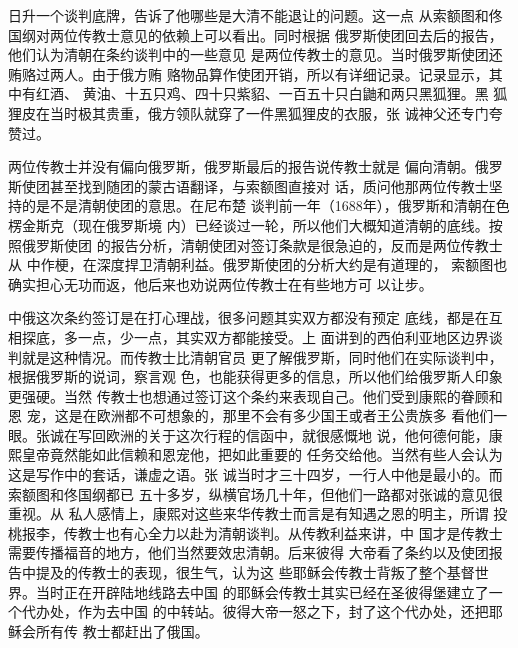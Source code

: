 日升一个谈判底牌，告诉了他哪些是大清不能退让的问题。这一点%
从索额图和佟国纲对两位传教士意见的依赖上可以看出。同时根据%
俄罗斯使团回去后的报告，他们认为清朝在条约谈判中的一些意见%
是两位传教士的意见。当时俄罗斯使团还贿赂过两人。由于俄方贿%
赂物品算作使团开销，所以有详细记录。记录显示，其中有红酒、%
黄油、十五只鸡、四十只紫貂、一百五十只白鼬和两只黑狐狸。黑%
狐狸皮在当时极其贵重，俄方领队就穿了一件黑狐狸皮的衣服，张%
诚神父还专门夸赞过。%
\par
两位传教士并没有偏向俄罗斯，俄罗斯最后的报告说传教士就是%
偏向清朝。俄罗斯使团甚至找到随团的蒙古语翻译，与索额图直接对%
话，质问他那两位传教士坚持的是不是清朝使团的意思。在尼布楚%
谈判前一年（1688年），俄罗斯和清朝在色楞金斯克（现在俄罗斯境%
内）已经谈过一轮，所以他们大概知道清朝的底线。按照俄罗斯使团%
的报告分析，清朝使团对签订条款是很急迫的，反而是两位传教士从%
中作梗，在深度捍卫清朝利益。俄罗斯使团的分析大约是有道理的，%
索额图也确实担心无功而返，他后来也劝说两位传教士在有些地方可%
以让步。%
\par
中俄这次条约签订是在打心理战，很多问题其实双方都没有预定%
底线，都是在互相探底，多一点，少一点，其实双方都能接受。上%
面讲到的西伯利亚地区边界谈判就是这种情况。而传教士比清朝官员%
更了解俄罗斯，同时他们在实际谈判中，根据俄罗斯的说词，察言观%
色，也能获得更多的信息，所以他们给俄罗斯人印象更强硬。当然%
传教士也想通过签订这个条约来表现自己。他们受到康熙的眷顾和恩%
宠，这是在欧洲都不可想象的，那里不会有多少国王或者王公贵族多%
看他们一眼。张诚在写回欧洲的关于这次行程的信函中，就很感慨地%
说，他何德何能，康熙皇帝竟然能如此信赖和恩宠他，把如此重要的%
任务交给他。当然有些人会认为这是写作中的套话，谦虚之语。张%
诚当时才三十四岁，一行人中他是最小的。而索额图和佟国纲都已%
五十多岁，纵横官场几十年，但他们一路都对张诚的意见很重视。从%
私人感情上，康熙对这些来华传教士而言是有知遇之恩的明主，所谓%
投桃报李，传教士也有心全力以赴为清朝谈判。从传教利益来讲，中%
国才是传教士需要传播福音的地方，他们当然要效忠清朝。后来彼得%
大帝看了条约以及使团报告中提及的传教士的表现，很生气，认为这%
些耶稣会传教士背叛了整个基督世界。当时正在开辟陆地线路去中国%
的耶稣会传教士其实已经在圣彼得堡建立了一个代办处，作为去中国%
的中转站。彼得大帝一怒之下，封了这个代办处，还把耶稣会所有传%
教士都赶出了俄国。%
